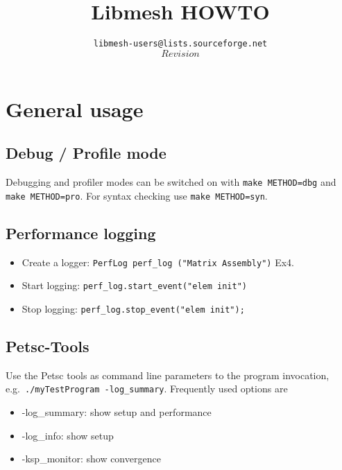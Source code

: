 \documentclass{article}
\newcommand{\exmp}[1]{\textsf{Ex#1}}
\newcommand{\code}[1]{\texttt{#1}}
\begin{document}
\lstset{language=C++}


\title{Libmesh HOWTO}
\author{\texttt{libmesh-users@lists.sourceforge.net} \\
        $$Revision$$}
\maketitle

\section{General usage}
\label{sec:usage-tips}

\subsection{Debug / Profile mode}
\label{sec:debug-profile}

Debugging and profiler modes can be switched on with \code{make METHOD=dbg}
and \code{make METHOD=pro}.  For syntax checking use \code{make METHOD=syn}.

\subsection{Performance logging}
\label{sec:performance-logging}

\begin{itemize}
\item Create a logger: \code{PerfLog perf\_log ("Matrix Assembly")} \exmp{4}.
\item Start logging: \code{perf\_log.start\_event("elem init")}
\item Stop logging: \code{perf\_log.stop\_event("elem init");}
\end{itemize}

\subsection{Petsc-Tools}
\label{sec:petsc-tools}

Use the Petsc tools as command line parameters to the program invocation,
e.g.~\code{./myTestProgram -log\_summary}. Frequently used options are

\begin{itemize}
\item -log\_summary: show setup and performance
\item -log\_info: show setup
\item -ksp\_monitor: show convergence
\end{itemize}
\end{document}

